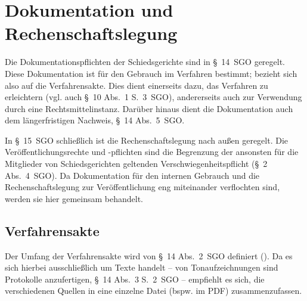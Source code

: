 

\chapter{Dokumentation und Rechenschaftslegung}
\label{Dokumentation}
Die Dokumentationspflichten der Schiedsgerichte sind in \S~14~SGO geregelt.
Diese Dokumentation ist für den Gebrauch im Verfahren bestimmt; bezieht sich also auf die Verfahrensakte.
Dies dient einerseits dazu, das Verfahren zu erleichtern (vgl. auch \S~10 Abs.~1 S.~3~SGO), andererseits auch zur Verwendung durch eine Rechtsmittelinstanz.
Darüber hinaus dient die Dokumentation auch dem längerfristigen Nachweis, \S~14 Abs.~5~SGO.

In \S~15~SGO schließlich ist die Rechenschaftslegung nach außen geregelt.
Die Veröffentlichungsrechte und -pflichten sind die Begrenzung der ansonsten für die Mitglieder von Schiedsgerichten geltenden Verschwiegenheitspflicht (\S~2 Abs.~4~SGO).
Da Dokumentation für den internen Gebrauch und die Rechenschaftslegung zur Veröffentlichung eng miteinander verflochten sind, werden sie hier gemeinsam behandelt.

\section{Verfahrensakte}
\label{Dokumentation:Akte}
Der Umfang der Verfahrensakte wird von \S~14 Abs.~2~SGO definiert ().
Da es sich hierbei ausschließlich um Texte handelt -- von Tonaufzeichnungen sind Protokolle anzufertigen, \S~14 Abs.~3 S.~2~SGO -- empfiehlt es sich, die verschiedenen Quellen in eine einzelne Datei (bspw. im PDF) zusammenzufassen.

